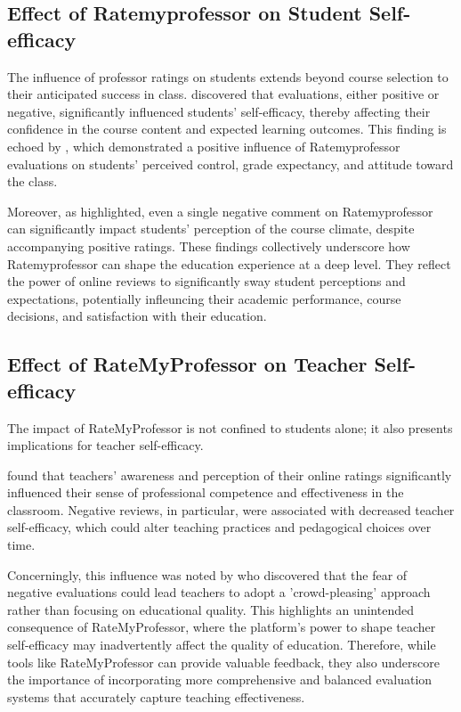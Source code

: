 \documentclass[doc, 12pt, twocolumn]{apa7}
\begin{document}
\subsection{Effect of Ratemyprofessor on Student Self-efficacy}
The influence of professor ratings on students extends beyond course selection to their anticipated success in class. \textcite{boswell_effects_2020} discovered that evaluations, either positive or negative, significantly influenced students' self-efficacy, thereby affecting their confidence in the course content and expected learning outcomes. This finding is echoed by \textcite{kowai-bell_rate_2011}, which demonstrated a positive influence of Ratemyprofessor evaluations on students' perceived control, grade expectancy, and attitude toward the class.

Moreover, as \textcite{scherr_single_2013} highlighted, even a single negative comment on Ratemyprofessor can significantly impact students' perception of the course climate, despite accompanying positive ratings. These findings collectively underscore how Ratemyprofessor can shape the education experience at a deep level. They reflect the power of online reviews to significantly sway student perceptions and expectations, potentially infleuncing their academic performance, course decisions, and satisfaction with their education.


\subsection{Effect of RateMyProfessor on Teacher Self-efficacy}
The impact of RateMyProfessor is not confined to students alone; it also presents implications for teacher self-efficacy. 



\textcite{smith_teacher_2018} found that teachers' awareness and perception of their online ratings significantly influenced their sense of professional competence and effectiveness in the classroom. Negative reviews, in particular, were associated with decreased teacher self-efficacy, which could alter teaching practices and pedagogical choices over time.

Concerningly, this influence was noted by \textcite{jones_pedagogical_2019} who discovered that the fear of negative evaluations could lead teachers to adopt a 'crowd-pleasing' approach rather than focusing on educational quality. This highlights an unintended consequence of RateMyProfessor, where the platform's power to shape teacher self-efficacy may inadvertently affect the quality of education. Therefore, while tools like RateMyProfessor can provide valuable feedback, they also underscore the importance of incorporating more comprehensive and balanced evaluation systems that accurately capture teaching effectiveness.









\printbibliography
\end{document}
